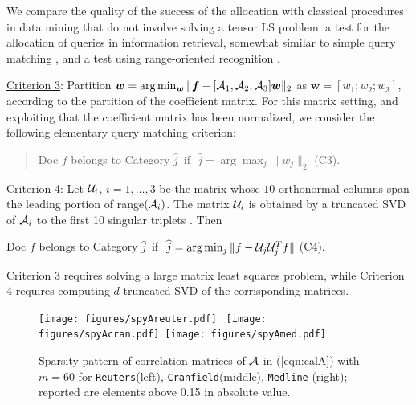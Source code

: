 \documentclass{siamart190516}
\begin{document}
We compare the quality of the success of the allocation with
classical procedures in data mining that do not involve solving a tensor LS problem: a test for the allocation of queries in information retrieval, somewhat similar to simple query matching \cite[section 3.1.2]{Berry.Browne.99}, 
and a test using range-oriented recognition \cite[section 11.2]{EldenBook.19}.
\vskip 0.1in
\begin{description}

    \item \underline{Criterion 3}:
Partition $\bm w = {\rm arg}\min_{\bm w} \|\bm f-[{\cal A}_1, {\cal A}_2, {\cal A}_3] 
{\bm w}\|_2$
as ${\bm w}=[w_1;w_2;w_3]$, according to the partition of the coefficient matrix. 
For this matrix setting, and exploiting that the coefficient matrix
has been normalized, we consider
the following elementary query matching criterion:

\vskip 0.1in
\begin{quotation}
Doc $f$ belongs to Category $\widehat j\,$ if  $\,\,\widehat j= \arg\max_j \|w_j\|_2$ \hskip 0.1in (C3).
\end{quotation}
\vskip 0.1in
 \item \underline{Criterion 4}: Let ${\cal U}_i$, $i=1, \ldots, 3$ be the
 matrix whose $10$ orthonormal columns span the leading portion of 
 {\rm range}$({\cal A}_i)$. The matrix ${\cal U}_i$ is obtained by
 a truncated SVD of ${\cal A}_i$ to the first 10 singular triplets \cite[Section 11.2]{EldenBook.19}.
 Then
 \vskip 0.1in
 \begin{center}
Doc $f$ belongs to Category $\widehat j\,$ if  $\,\,\widehat j= \arg\min_j \|f - {\cal U}_j{\cal U}_j^T f\|$ \hskip 0.1in (C4).
\end{center}
\vskip 0.1in
 
\end{description}
\vskip 0.1in
Criterion 3 requires solving a large matrix least squares problem,
while Criterion 4 requires computing $d$ truncated SVD of the
corrisponding matrices.

\begin{figure}[hbt]
\centering
\texttt{[image: figures/spyAreuter.pdf]} \,
\texttt{[image: figures/spyAcran.pdf]}\,
\texttt{[image: figures/spyAmed.pdf]} 
   \caption{Sparsity pattern of correlation matrices of
   ${\cal A}$ in (\ref{eqn:calA}) with $m=60$ for {\tt Reuters}(left), {\tt Cranfield}(middle), {\tt Medline} (right); reported are elements above 0.15 in absolute value.\label{fig:spydata}}
\end{figure}
\end{document}
